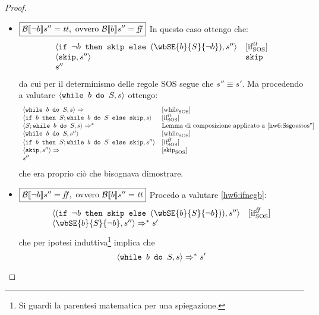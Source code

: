 {\begin{enumerate}
\begin{proof}
\begin{itemize}
	\begin{itemize}
		\item $\boxed{\B{\neg b}'' = \semtrue, \text{ ovvero } \B{b}'' = \semfalse}$
		In questo caso ottengo che:
		$$
		\begin{array}{ll}
		\confSs{\ifABC{\neg b}{\skipForFriends}{(\wbSE{b}{S}{\neg b})}}{s''} & \ifttSOS \\
		\confSs{\skipForFriends}{s''} & \skipForFriends \\
		s''
		\end{array}
		$$
		da cui per il determinismo delle regole SOS segue che $\boxed{s'' \equiv s'}$. Ma procedendo
		a valutare $\confSs{\wbS{b}{S}}{s}$ ottengo:
		$$
		\begin{array}{ll}
		\confSs{\wbS{b}{S}}{s} \Rar{} & \whileSOS \\
		\confSs{\ifABC{b}{S; \wbS{b}{S}}{\skipForFriends}}{s} & \ifttSOS \\
		\confSs{S; \wbS{b}{S}}{s} \Rar{*} & \text{Lemma di composizione applicato a \ref{hw6:Ssgoestos''}} \\
		\confSs{\wbS{b}{S}}{s''} & \whileSOS \\
		\confSs{\ifABC{b}{S; \wbS{b}{S}}{\skipForFriends}}{s''} & \ifffSOS \\
		\confSs{\skipForFriends}{s''} \Rar{} & \skipSOS \\
		s''
		\end{array}
		$$
		che era proprio ciò che bisognava dimostrare.
		\item $\boxed{\B{\neg b}'' = \semfalse, \text{ ovvero } \B{b}'' = \semtrue}$
		Procedo a valutare \ref{hw6:ifnegb}:
		$$
		\begin{array}{ll}
		\confSs{(\ifABC{\neg b}{\skipForFriends}{(\wbSE{b}{S}{\neg b})})}{s''} & \ifffSOS\\
		\confSs{\wbSE{b}{S}{\neg b}}{s''} \Rar{*} s'
		\end{array}
		$$
		che per ipotesi induttiva\footnote{Si guardi la parentesi matematica per una spiegazione.} implica che
		$$
		\confSs{\wbS{b}{S}}{s} \Rar{*} s'
		$$
	\end{itemize}
	

\end{itemize}
\end{proof}
\end{enumerate}}
